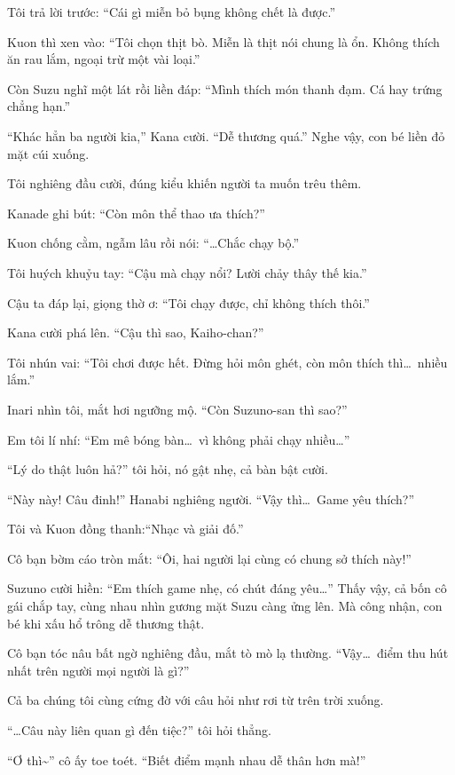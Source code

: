 \documentclass[../main.tex]{subfiles}
\begin{document}
Tôi trả lời trước: ``Cái gì miễn bỏ bụng không chết là được.''

Kuon thì xen vào: ``Tôi chọn thịt bò. Miễn là thịt nói chung là ổn. Không thích ăn rau lắm, ngoại trừ một vài loại.''

Còn Suzu nghĩ một lát rồi liền đáp: ``Mình thích món thanh đạm. Cá hay trứng chẳng hạn.''

``Khác hẳn ba người kia,'' Kana cười. ``Dễ thương quá.'' Nghe vậy, con bé liền đỏ mặt cúi xuống.

Tôi nghiêng đầu cười, đúng kiểu khiến người ta muốn trêu thêm.

Kanade ghi bút: ``Còn môn thể thao ưa thích?''

Kuon chống cằm, ngẫm lâu rồi nói: ``\dots Chắc chạy bộ.''

Tôi huých khuỷu tay: ``Cậu mà chạy nổi? Lười chảy thây thế kia.''

Cậu ta đáp lại, giọng thờ ơ: ``Tôi chạy được, chỉ không thích thôi.''

Kana cười phá lên. ``Cậu thì sao, Kaiho-chan?''

Tôi nhún vai: ``Tôi chơi được hết. Đừng hỏi môn ghét, còn môn thích thì\dots\ nhiều lắm.''

Inari nhìn tôi, mắt hơi ngưỡng mộ. ``Còn Suzuno-san thì sao?''

Em tôi lí nhí: ``Em mê bóng bàn\dots\ vì không phải chạy nhiều\dots ''

``Lý do thật luôn hả?'' tôi hỏi, nó gật nhẹ, cả bàn bật cười.

``Này này! Câu đinh!'' Hanabi nghiêng người. ``Vậy thì\dots\ Game yêu thích?''

Tôi và Kuon đồng thanh:``Nhạc và giải đố.''

Cô bạn bờm cáo tròn mắt: ``Ôi, hai người lại cùng có chung sở thích này!''

Suzuno cười hiền: ``Em thích game nhẹ, có chút đáng yêu\dots'' Thấy vậy, cả bốn cô gái chắp tay, cùng nhau nhìn gương mặt Suzu càng ửng lên. Mà công nhận, con bé khi xấu hổ trông dễ thương thật.

Cô bạn tóc nâu bất ngờ nghiêng đầu, mắt tò mò lạ thường. ``Vậy\dots\ điểm thu hút nhất trên người mọi người là gì?''

Cả ba chúng tôi cùng cứng đờ với câu hỏi như rơi từ trên trời xuống.

``\dots Câu này liên quan gì đến tiệc?'' tôi hỏi thẳng.

``Ơ thì\~{}'' cô ấy toe toét. ``Biết điểm mạnh nhau dễ thân hơn mà!''
\end{document}
